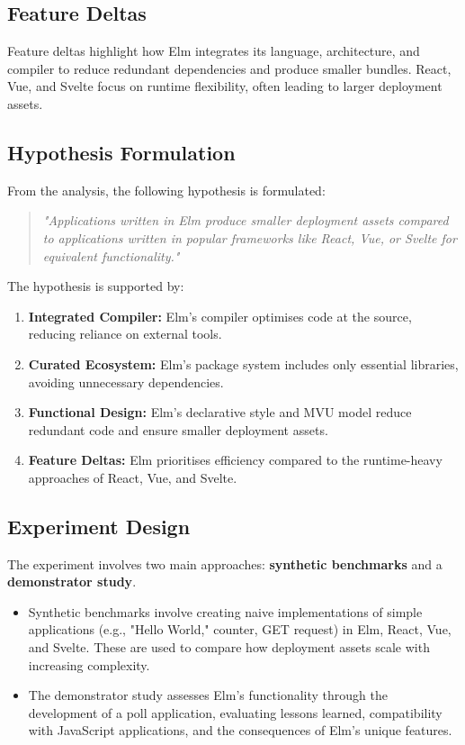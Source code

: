 \subsection{Feature Deltas}
Feature deltas highlight how Elm integrates its language, architecture, and compiler to reduce redundant dependencies and produce smaller bundles. React, Vue, and Svelte focus on runtime flexibility, often leading to larger deployment assets.

\subsection{Hypothesis Formulation}
From the analysis, the following hypothesis is formulated:
\begin{quote}
    \textit{"Applications written in Elm produce smaller deployment assets compared to applications written in popular frameworks like React, Vue, or Svelte for equivalent functionality."}
\end{quote}

The hypothesis is supported by:
\begin{enumerate}
    \item \textbf{Integrated Compiler:} Elm’s compiler optimises code at the source, reducing reliance on external tools.
    \item \textbf{Curated Ecosystem:} Elm's package system includes only essential libraries, avoiding unnecessary dependencies.
    \item \textbf{Functional Design:} Elm's declarative style and MVU model reduce redundant code and ensure smaller deployment assets.
    \item \textbf{Feature Deltas:} Elm prioritises efficiency compared to the runtime-heavy approaches of React, Vue, and Svelte.
\end{enumerate}

\subsection{Experiment Design}
The experiment involves two main approaches: \textbf{synthetic benchmarks} and a \textbf{demonstrator study}.
\begin{itemize}
    \item Synthetic benchmarks involve creating naive implementations of simple applications (e.g., "Hello World," counter, GET request) in Elm, React, Vue, and Svelte. These are used to compare how deployment assets scale with increasing complexity.
    \item The demonstrator study assesses Elm's functionality through the development of a poll application, evaluating lessons learned, compatibility with JavaScript applications, and the consequences of Elm’s unique features.
\end{itemize}

